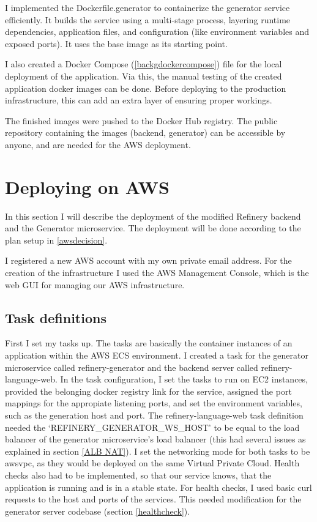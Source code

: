 			I implemented the Dockerfile.generator to containerize the generator service efficiently. It builds the service using a multi-stage process, 
			layering runtime dependencies, application files, and configuration (like environment variables and exposed ports). 
			It uses the base image as its starting point.

			I also created a Docker Compose (\ref{backgdockercompose}) file for the local deployment of the application. Via this, the manual testing of the 
			created application docker images can be done. Before deploying to the production infrastructure, this can add an extra layer of ensuring proper workings.

			The finished images were pushed to the Docker Hub registry. The public repository containing the images (backend,
			generator) can be accessible by anyone, and are needed for the AWS deployment.


	\section{Deploying on AWS} \label{awsdeploy}
		In this section I will describe the deployment of the modified Refinery backend and the Generator microservice. The deployment will be 
		done according to the plan setup in \ref{awsdecision}.

		I registered a new AWS account with my own private email address.
		For the creation of the infrastructure I used the AWS Management Console, which is the web GUI for 
		managing our AWS infrastructure.

		\subsection{Task definitions} \label{awstasks}
			First I set my tasks up. The tasks are basically the container instances of an application within the AWS ECS environment. 
			I created a task
			for the generator microservice called refinery-generator and the backend server called refinery-language-web.
			In the task configuration, I set the tasks to run on EC2 instances, provided the belonging docker registry link for the service,
			assigned the port mappings for the appropiate listening ports, and set the environment variables, 
			such as the generation host and port. The refinery-language-web task definition needed the `REFINERY\_GENERATOR\_WS\_HOST' to 
			be equal to the load balancer of the generator microservice's load balancer (this had several issues as explained 
			in section \ref{ALB NAT}).
			I set the networking mode for both tasks to be awsvpc, as they would be deployed on the same Virtual Private Cloud.
			Health checks also had to be implemented, so that our service knows, that the application is running and is in a stable state.
			For health checks, I used basic curl requests to the host and ports of the services. This needed modification for 
			the generator server codebase (section \ref{healthcheck}).

